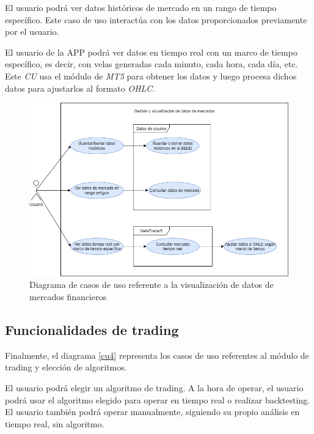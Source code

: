 El usuario podrá ver datos históricos de mercado en un rango de tiempo específico. Este caso de uso interactúa con los datos proporcionados previamente por el usuario. \newline

El usuario de la APP podrá ver datos en tiempo real con un marco de tiempo específico, es decir, con velas generadas cada minuto, cada hora, cada día, etc. Este \textit{CU} usa el módulo de \textit{MT5} para obtener los datos y luego procesa dichos datos para ajustarlos al formato \textit{OHLC}.


\begin{figure}[h] 
	\includegraphics[width=1\textwidth]{imagenes/diagramas_casos_de_uso/CU3-gestion_visualizacion_datos.png} 
	\caption{Diagrama de casos de uso referente a la visualización de datos de mercados financieros} \label{cu3}
\end{figure}


\subsection{Funcionalidades de trading}

Finalmente, el diagrama \ref{cu4} representa los casos de uso referentes al módulo de trading y elección de algoritmos. \newline

El usuario podrá elegir un algoritmo de trading. A la hora de operar, el usuario podrá usar el algoritmo elegido para operar en tiempo real o realizar backtesting. El usuario también podrá operar manualmente, siguiendo su propio análisis en tiempo real, sin algoritmo. \newline


